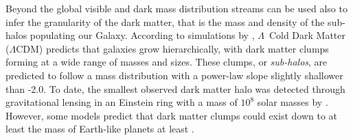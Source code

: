 \documentclass[draft]{aa}
\begin{document}
  
  
  Beyond the global visible and dark mass distribution streams can be used also to infer the granularity of the dark matter, that is the mass and density of the sub-halos populating our Galaxy. According to simulations by \citet{2008MNRAS.391.1685S}, $\Lambda$~Cold Dark Matter ($\Lambda$CDM) predicts that galaxies grow hierarchically, with dark matter clumps forming at a wide range of masses and sizes. These clumps, or \textit{sub-halos}, are predicted to follow a mass distribution with a power-law slope slightly shallower than -2.0. To date, the smallest observed dark matter halo was detected through gravitational lensing in an Einstein ring with a mass of $10^8$ solar masses by \citet{2012Natur.481..341V}. However, some models predict that dark matter clumps could exist down to at least the mass of Earth-like planets at least \citep[see][and discussion in \citet{2021arXiv211101148A}]{2005JCAP...08..003G}. 
\end{document}
